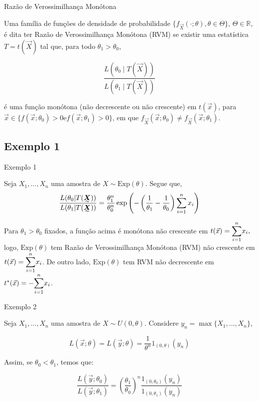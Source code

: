 \documentclass[12pt]{beamer}
\begin{document}
\begin{frame}{Razão de Verossimilhança Monótona}
\begin{definicao}
\justifying
Uma família de funções de densidade de probabilidade \(\{f_{\vec{X}}(\cdot; \theta), \theta \in \Theta\}\), \(\Theta \in \mathbb{R}\), é dita ter Razão de Verossimilhança Monótona (RVM) se existir uma estatística \(T = t(\vec{X})\) tal que, para todo \(\theta_1 > \theta_0\),

\[
\frac{L(\theta_0 \mid T(\vec{X}))}{L(\theta_1 \mid T(\vec{X}))}
\]

é uma função monótona (não decrescente ou não crescente) em \(t(\vec{x})\), para \(\vec{x} \in \{f(\vec{x}; \theta_0) > 0 \text{e} f(\vec{x}; \theta_1) > 0\}\), em que \(f_{\vec{X}}(\vec{x}; \theta_0) \neq f_{\vec{X}}(\vec{x}; \theta_1)\).

\end{definicao}
\end{frame}

\subsection{Exemplo 1}
\begin{frame}{Exemplo 1}
\vspace{-0.3cm}
\begin{block}{}
\justifying
Seja $X_1, \ldots, X_n$ uma amostra de $X \sim \text{Exp}(\theta)$. Segue que,
\[
\frac{L(\theta_0 | T(\tend{X}))}{L(\theta_1 | T(\tend{X}))} = \frac{\theta_{1}^{n}}{\theta_{0}^{n}} \exp\left(-\left(\frac{1}{\theta_1} - \frac{1}{\theta_0}\right)\sum_{i=1}^{n} x_i\right)
\]
\end{block}
\pause
\vspace{-0.3cm}
\begin{block}{}
\justifying
Para $\theta_{1}>\theta_{0}$ fixados, a função acima é monótona não crescente em $t(\Vec{x}) = {\displaystyle \sum_{i=1}^{n}} x_i,$ logo, $\text{Exp}(\theta)$ tem Razão de Verossimilhança Monótona (RVM) não crescente em $t(\Vec{x}) = {\displaystyle \sum_{i=1}^{n}} x_i$. De outro lado, $\text{Exp}(\theta)$ tem RVM não decrescente em $t^{*}(\Vec{x}) = -{\displaystyle \sum_{i=1}^{n}} x_i$.
\end{block}
\end{frame}

\begin{frame}{Exemplo 2}
\begin{block}{}
\justifying
Seja \(X_1, \ldots, X_n\) uma amostra de \(X \sim U(0, \theta)\). Considere \(y_{n} = \max\{X_1, \ldots, X_n\}\),

\[
L(\vec{x}; \theta) = L(\vec{y}; \theta)= \frac{1}{\theta^n} 1_{(0, \theta)}(y_n)
\]

Assim, se \(\theta_0 < \theta_1\), temos que:

\[
\frac{L(\vec{y}; \theta_0)}{L(\vec{y}; \theta_1)} = \left(\frac{\theta_1}{\theta_0}\right)^n \frac{1_{(0, \theta_0)}(y_n)}{1_{(0, \theta_1)}(y_n)}
\]

\end{block}
\end{frame}
\end{document}
